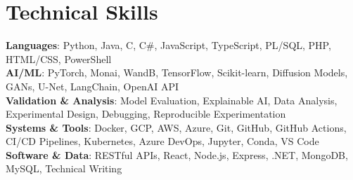 \documentclass[letterpaper,11pt]{article}
\begin{document}
\section{Technical Skills}
\begin{itemize}[leftmargin=0.15in, label={}]
    \small{
    \item{
        \textbf{Languages}{: Python, Java, C, C\#, JavaScript, TypeScript, PL/SQL, PHP, HTML/CSS, PowerShell} \\
        \textbf{AI/ML}{: PyTorch, Monai, WandB, TensorFlow, Scikit-learn, Diffusion Models, GANs, U-Net, LangChain, OpenAI API} \\
        \textbf{Validation \& Analysis}{: Model Evaluation, Explainable AI, Data Analysis, Experimental Design, Debugging, Reproducible Experimentation} \\
        \textbf{Systems \& Tools}{: Docker, GCP, AWS, Azure, Git, GitHub, GitHub Actions, CI/CD Pipelines, Kubernetes, Azure DevOps, Jupyter, Conda, VS Code} \\
        \textbf{Software \& Data}{: RESTful APIs, React, Node.js, Express, .NET, MongoDB, MySQL, Technical Writing}
    }}
\end{itemize}

\end{document}

